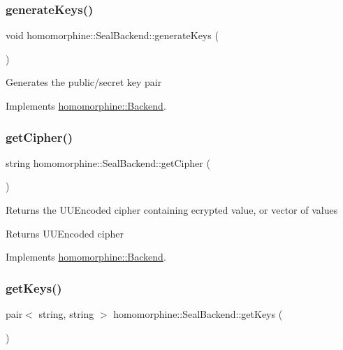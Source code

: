 \subsubsection{\texorpdfstring{generateKeys()}{generateKeys()}}
{\footnotesize\ttfamily void homomorphine\+::\+Seal\+Backend\+::generate\+Keys (\begin{DoxyParamCaption}{ }\end{DoxyParamCaption})\hspace{0.3cm}{\ttfamily [virtual]}}

Generates the public/secret key pair 

Implements \mbox{\hyperlink{classhomomorphine_1_1_backend_a88cd9469f1394a0a2d15c2f603280763}{homomorphine\+::\+Backend}}.

\mbox{\label{classhomomorphine_1_1_seal_backend_a0917c586791e74b83f4ca0932e5e4d8e}} 
\subsubsection{\texorpdfstring{getCipher()}{getCipher()}}
{\footnotesize\ttfamily string homomorphine\+::\+Seal\+Backend\+::get\+Cipher (\begin{DoxyParamCaption}{ }\end{DoxyParamCaption})\hspace{0.3cm}{\ttfamily [virtual]}}

Returns the U\+U\+Encoded cipher containing ecrypted value, or vector of values

\begin{DoxyReturn}{Returns}
U\+U\+Encoded cipher 
\end{DoxyReturn}


Implements \mbox{\hyperlink{classhomomorphine_1_1_backend_a6c6ed25dec9809b3f216e185e8026e97}{homomorphine\+::\+Backend}}.

\mbox{\label{classhomomorphine_1_1_seal_backend_a30358e6405e2d1470468cf55aefb3f4d}} 
\subsubsection{\texorpdfstring{getKeys()}{getKeys()}}
{\footnotesize\ttfamily pair$<$ string, string $>$ homomorphine\+::\+Seal\+Backend\+::get\+Keys (\begin{DoxyParamCaption}{ }\end{DoxyParamCaption})\hspace{0.3cm}{\ttfamily [virtual]}}

